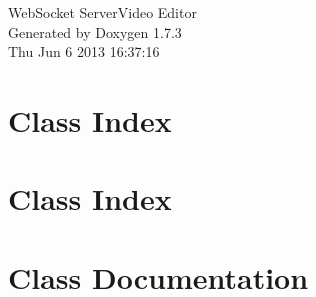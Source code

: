 \documentclass[a4paper]{book}
\begin{document}
\hypersetup{pageanchor=false}
\begin{titlepage}
\vspace*{7cm}
\begin{center}
{\Large WebSocket ServerVideo Editor }\\
\vspace*{1cm}
{\large Generated by Doxygen 1.7.3}\\
\vspace*{0.5cm}
{\small Thu Jun 6 2013 16:37:16}\\
\end{center}
\end{titlepage}
\clearemptydoublepage
{}
\tableofcontents
\clearemptydoublepage
{}
\hypersetup{pageanchor=true}
\chapter{Class Index}

\chapter{Class Index}

\chapter{Class Documentation}







































\printindex
\end{document}
